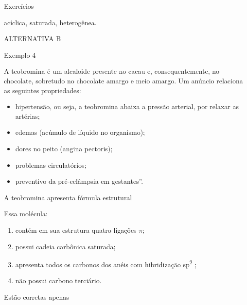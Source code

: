 \documentclass{beamer}
\begin{document}
\begin{frame}[label={sec:orgaa6c72b}]{Exercícios}
\begin{block}{}
\begin{answer}[print=true]





\alert{acíclica, saturada, heterogênea.}


ALTERNATIVA \alert{B}
\end{answer}
\end{block}

\begin{block}{Exemplo 4}
\begin{question}
A teobromina é um alcaloide presente no cacau e, consequentemente, no chocolate, sobretudo no chocolate amargo e meio amargo. Um anúncio relaciona as seguintes propriedades:

\begin{itemize}
\item hipertensão, ou seja, a teobromina abaixa a pressão arterial, por relaxar as artérias;
\item edemas (acúmulo de líquido no organismo);
\item dores no peito (angina pectoris);
\item problemas circulatórios;
\item preventivo da pré-eclâmpsia em gestantes”.
\end{itemize}

A teobromina apresenta fórmula estrutural



Essa molécula:
\begin{enumerate}[label=\Roman*]
\item contém em sua estrutura quatro ligações \(\pi\);
\item possui cadeia carbônica saturada;
\item apresenta todos os carbonos dos anéis com hibridização sp\textsuperscript{2} ;
\item não possui carbono terciário.
\end{enumerate}

Estão corretas apenas  


\end{question}
\end{block}
\end{frame}
\end{document}
